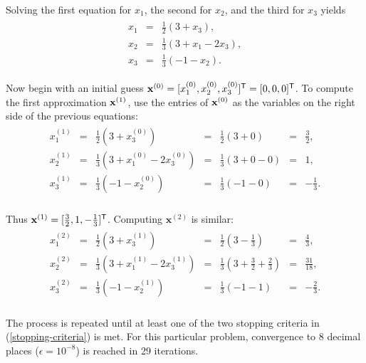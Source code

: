 Solving the first equation for $x_1$, the second for $x_2$, and the third for $x_3$ yields
\begin{align*}
\begin{array}{ccc}
    x_1 & = & \frac{1}{2}(3 + x_3), \\
    x_2 & = & \frac{1}{3}(3 + x_1 - 2x_3), \\
    x_3 & = & \frac{1}{3}(-1 - x_2).
\end{array}
\end{align*}

Now begin with an initial guess $\mathbf{x}^{(0)} = [x^{(0)}_1, x^{(0)}_2, x^{(0)}_3]^{\mathsf T} = [0,0,0]^{\mathsf T}$.
To compute the first approximation $\mathbf{x}^{(1)}$, use the entries of $\mathbf{x}^{(0)}$ as the variables on the right side of the previous equations:
\begin{align*}
\begin{array}{ccccccr}
    x^{(1)}_1 & = & \frac{1}{2}(3 + x^{(0)}_3) & = & \frac{1}{2} (3 + 0) & = & \frac{3}{2}, \\
    x^{(1)}_2 & = & \frac{1}{3}(3 + x^{(0)}_1 - 2x^{(0)}_3) & = & \frac{1}{3} (3 + 0 - 0) & = & 1, \\
    x^{(1)}_3 & = & \frac{1}{3}(-1 - x^{(0)}_2) & = & \frac{1}{3} (-1 - 0) & = & -\frac{1}{3}. \\
\end{array}
\end{align*}

Thus $\mathbf{x}^{(1)} = [\frac{3}{2}, 1, -\frac{1}{3}]^{\mathsf T}$.
Computing $\mathbf{x}^{(2)}$ is similar:
\begin{align*}
\begin{array}{ccccccc}
x^{(2)}_1 & = & \frac{1}{2} ( 3 + x^{(1)}_3)  & = & \frac{1}{2} (3 - \frac{1}{3})     & = & \frac{4}{3}, \\
x^{(2)}_2 & = & \frac{1}{3} ( 3 + x^{(1)}_1 - 2x^{(1)}_3) & = & \frac{1}{3} (3 + \frac{3}{2} + \frac{2}{3}) & = &  \frac{31}{18}, \\
x^{(2)}_3 & = & \frac{1}{3} ( -1 - x^{(1)}_2)       & = & \frac{1}{3} (-1 - 1)    & = & -\frac{2}{3}. \\
\end{array}
\end{align*}

The process is repeated until at least one of the two stopping criteria in (\ref{stopping-criteria}) is met.
For this particular problem, convergence to 8 decimal places ($\epsilon = 10^{-8}$) is reached in 29 iterations.

